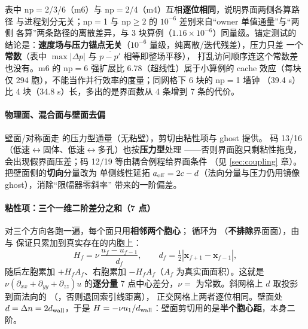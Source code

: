 表中 np$=$2/3/6（m6）与 np$=$2/4（m4）互相\textbf{逐位相同}，说明界面两侧各算路径
与进程划分无关；np$=$1 与 np$\ge2$ 的 $10^{-6}$ 差别来自“owner 单值通量”与“两侧
各算”两条路径的离散差异，与 3 块算例（$1.16\times10^{-6}$）同量级。锚定测试的
结论是：\textbf{速度场与压力锚点无关}（$10^{-6}$ 量级，纯离散/迭代残差），压力只差
一个\textbf{常数}（表中 $\max|\Delta p|$ 与 $\overline{p-p'}$ 相等即整场平移），
打乱访问顺序连这个常数差也没有。m6 的 np$=$6 强扩展比 6.78（超线性）属于小算例的
cache 效应（每块仅 294 胞），不能当作并行效率的度量；同网格下 6 块的 np$=$1 墙钟
（39.4 s）比 4 块（34.8 s）长，多出的是界面数从 4 条增到 7 条的代价。

\paragraph{物理面、混合面与壁面去偏}

壁面/对称面走  的压力型通量（无粘壁），剪切由粘性项与 ghost 提供。
码 13/16（低速$\leftrightarrow$固体、低速$\leftrightarrow$多孔）也按\textbf{压力型}处理
——否则界面胞只剩粘性拖曳，会出现假界面压差；码 12/19 等由耦合例程给界面条件
（见 \ref{sec:coupling} 章）。 把壁面侧的\textbf{切向}分量改为
单侧线性延拓 $a_{\rm eff}=2c-d$（法向分量与压力仍用镜像 ghost），消除“限幅器零斜率”
带来的一阶偏差。

\paragraph{粘性项：三个一维二阶差分之和（7 点）}
 对三个方向各跑一遍，每个面只用\textbf{相邻两个胞心}；
循环为 （\textbf{不排除}界面面），由  与
 保证只累加到真实存在的内胞上：
\begin{equation}
H_f=\nu\,\frac{u_f-u_{f-1}}{d_f},\qquad
d_f=\tfrac12\left|\mathbf{x}_{f+1}-\mathbf{x}_{f-1}\right|,
\end{equation}
随后左胞累加 $+H_fA_f$、右胞累加 $-H_fA_f$（$A_f$ 为真实面面积）。这就是
$\nu\left(\partial_{xx}+\partial_{yy}+\partial_{zz}\right)u$ 的\textbf{逐分量}
7 点中心差分，$\nu=$ 为常数。斜网格上 $d$ 取投影到面法向的
（，否则退回索引线距离），
正交网格上两者逐位相同。壁面处 $d=\Delta n=2d_{\rm wall}$，于是
$H=-\nu u_1/d_{\rm wall}$：壁面剪切用的是\textbf{半个胞心距}，本身二阶。

